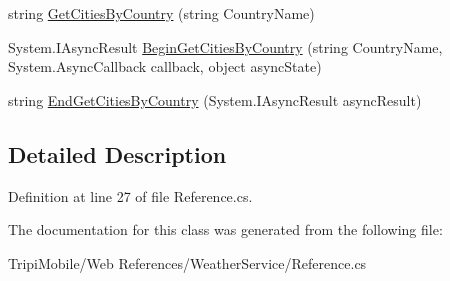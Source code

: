 \begin{DoxyCompactItemize}
\begin{DoxyCompactList}\small\item\em \item\end{DoxyCompactList}\item 
\hypertarget{class_tripi_1_1_weather_service_1_1_global_weather_a8ef68a20a6cbf71d394d55093090a9ad}{
string \hyperlink{class_tripi_1_1_weather_service_1_1_global_weather_a8ef68a20a6cbf71d394d55093090a9ad}{GetCitiesByCountry} (string CountryName)}
\label{class_tripi_1_1_weather_service_1_1_global_weather_a8ef68a20a6cbf71d394d55093090a9ad}

\begin{DoxyCompactList}\small\item\em \item\end{DoxyCompactList}\item 
\hypertarget{class_tripi_1_1_weather_service_1_1_global_weather_ab175bc07e71a2835f30113c9b0e92bd8}{
System.IAsyncResult \hyperlink{class_tripi_1_1_weather_service_1_1_global_weather_ab175bc07e71a2835f30113c9b0e92bd8}{BeginGetCitiesByCountry} (string CountryName, System.AsyncCallback callback, object asyncState)}
\label{class_tripi_1_1_weather_service_1_1_global_weather_ab175bc07e71a2835f30113c9b0e92bd8}

\begin{DoxyCompactList}\small\item\em \item\end{DoxyCompactList}\item 
\hypertarget{class_tripi_1_1_weather_service_1_1_global_weather_acebafb06f2cab88e592b9f6e09f25cc5}{
string \hyperlink{class_tripi_1_1_weather_service_1_1_global_weather_acebafb06f2cab88e592b9f6e09f25cc5}{EndGetCitiesByCountry} (System.IAsyncResult asyncResult)}
\label{class_tripi_1_1_weather_service_1_1_global_weather_acebafb06f2cab88e592b9f6e09f25cc5}

\begin{DoxyCompactList}\small\item\em \item\end{DoxyCompactList}\end{DoxyCompactItemize}


\subsection{Detailed Description}


Definition at line 27 of file Reference.cs.

The documentation for this class was generated from the following file:\begin{DoxyCompactItemize}
\item 
TripiMobile/Web References/WeatherService/Reference.cs\end{DoxyCompactItemize}

